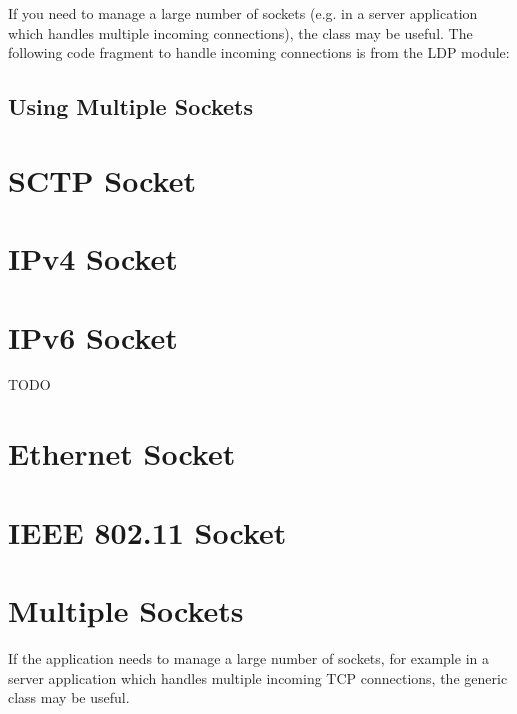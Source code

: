 If you need to manage a large number of sockets (e.g. in a server
application which handles multiple incoming connections), the
 class may be useful. The following code
fragment to handle incoming connections is from the LDP module:


\subsection*{Using Multiple Sockets}


\section{SCTP Socket}

\section{IPv4 Socket}




\section{IPv6 Socket}

\ifdraft TODO
\section{Ethernet Socket}

\section{IEEE 802.11 Socket}
\fi

\section{Multiple Sockets}

If the application needs to manage a large number of sockets, for example in a
server application which handles multiple incoming TCP connections, the generic
 class may be useful.


